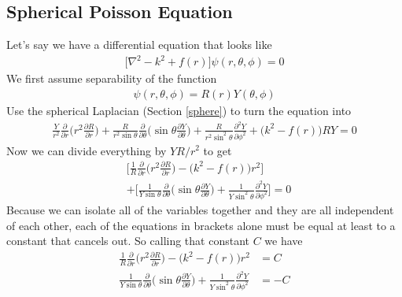 \subsection{Spherical Poisson Equation}
Let's say we have a differential equation that looks like
\begin{align}
\Big[\nabla^2 -k^2 + f(r)\Big]\psi(r,\theta,\phi) = 0
\end{align}
We first assume separability of the function
\begin{align}
\psi(r,\theta,\phi) = R(r)Y(\theta,\phi)
\end{align}
Use the spherical Laplacian (Section \ref{sphere}) to turn the equation into
\begin{align}
\frac{Y}{r^2}\frac{\partial}{\partial r}\Big(r^2\frac{\partial R}{\partial r}\Big) + \frac{R}{r^2\sin\theta}\frac{\partial} {\partial\theta}\Big(\sin\theta\frac{\partial Y}{\partial \theta}\Big) + \frac{R}{r^2\sin^2\theta}\frac{\partial^2 Y}{\partial\phi^2}+\Big(k^2 -f(r)\Big)RY= 0
\end{align}
Now we can divide everything by $YR/r^2$ to get
\begin{align}
&\Big[\frac{1}{R}\frac{\partial}{\partial r}\Big(r^2\frac{\partial R}{\partial r}\Big) -\Big(k^2 - f(r)\Big)r^2\Big]\\
&+ \Big[ \frac{1}{Y\sin\theta}\frac{\partial}{\partial\theta}\Big(\sin\theta\frac{\partial Y}{\partial\theta}\Big) + \frac{1}{Y\sin^2\theta}\frac{\partial^2 Y}{\partial\phi^2}\Big] = 0
\end{align}
Because we can isolate all of the variables together and they are all independent of each other, each of the equations in brackets alone must be equal at least to a constant that cancels out. So calling that constant $C$ we have
\begin{align}
\frac{1}{R}\frac{\partial}{\partial r}\Big(r^2\frac{\partial R}{\partial r}\Big) -\Big(k^2-f(r)\Big)r^2 &= C\\
\frac{1}{Y\sin\theta}\frac{\partial}{\partial\theta}\Big(\sin\theta\frac{\partial Y}{\partial\theta}\Big) + \frac{1}{Y\sin^2\theta}\frac{\partial^2 Y}{\partial\phi^2} &= -C
\end{align}
